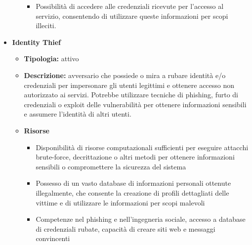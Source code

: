 \begin{itemize}
\begin{itemize}
\begin{itemize}
                            \vspace{3mm}
    
                            \item Possibilità di accedere alle credenziali ricevute per l'accesso al servizio, consentendo di utilizzare queste informazioni per scopi illeciti.
                        \end{itemize}
                \end{itemize}
    
            \item \textbf{Identity Thief}
                \begin{itemize}
                    \item \textbf{Tipologia:} attivo
    
                    \item \textbf{Descrizione:} avversario che possiede o mira a rubare identità e/o credenziali per impersonare gli utenti legittimi e ottenere accesso non autorizzato ai servizi.
                    Potrebbe utilizzare tecniche di phishing, furto di credenziali o exploit delle vulnerabilità per ottenere informazioni sensibili e assumere l'identità di altri utenti.
    
                    \item \textbf{Risorse}
                        \begin{itemize}
                            \item Disponibilità di risorse computazionali sufficienti per eseguire attacchi brute-force, decrittazione o altri metodi per ottenere informazioni sensibili o compromettere la sicurezza del sistema
    
                            \vspace{3mm}

                            \item Possesso di un vasto database di informazioni personali ottenute illegalmente, che consente la creazione di profili dettagliati delle vittime e di utilizzare le informazioni per scopi malevoli

                            \vspace{3mm}
    
                            \item Competenze nel phishing e nell'ingegneria sociale, accesso a database di credenziali rubate, capacità di creare siti web e messaggi convincenti
                        \end{itemize}
                \end{itemize}
    

\end{itemize}
